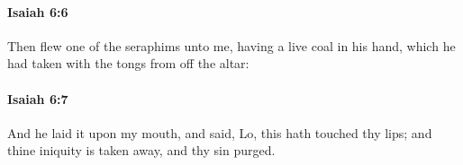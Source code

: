 		\paragraph{Isaiah 6:6} %
			\label{ISAIAH-6-6}

			Then flew one of the seraphims unto me, having a live coal in his hand, which he had taken with the tongs from off the altar:


		\paragraph{Isaiah 6:7} %
			\label{ISAIAH-6-7}

			And he laid it upon my mouth, and said, Lo, this hath touched thy lips; and thine iniquity is taken away, and thy sin purged.


